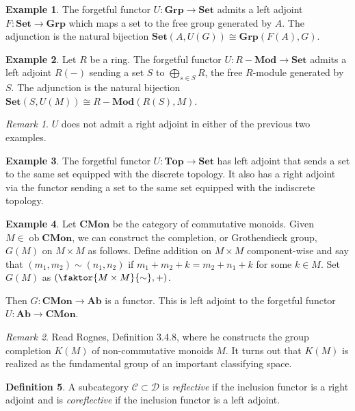\documentclass[10pt,letterpaper,cm]{nupset}
\theoremstyle{definition}
\newtheorem{definition}{Definition}
\newtheorem{exmp}[definition]{Example}
\theoremstyle{theorem}
\theoremstyle{remark}
\newtheorem{remark}{Remark}
\newcommand{\1}{\mathbf{1}}
\renewcommand{\c}{\mathscr{C}}
\renewcommand{\d}{\mathscr{D}}
\newcommand{\0}{\vec 0}
\DeclareMathOperator{\ob}{ob}
\begin{document}
\begin{exmp}
The forgetful functor $U: \mathbf{Grp} \to \mathbf{Set}$ admits a left adjoint $F: \mathbf{Set} \to \mathbf{Grp}$ which maps a set to the free group generated by $A$. The adjunction is the natural bijection $\mathbf{Set}(A, U(G)) \cong \mathbf{Grp}(F(A), G)$.
\end{exmp}

\begin{exmp}
Let $R$ be a ring. The forgetful functor $U: R-\mathbf{Mod}\to \mathbf{Set}$ admits a left adjoint $R(-)$ sending a set $S$ to $\bigoplus_{s\in S} R$, the free $R$-module generated by $S$. The adjunction is the natural bijection $\mathbf{Set}(S, U(M)) \cong R-\mathbf{Mod}(R(S), M)$.
\end{exmp}

\begin{remark}
$U$ does not admit a right adjoint in either of the previous two examples.
\end{remark}

\begin{exmp}
The forgetful functor $U: \mathbf{Top} \to \mathbf{Set}$ has left adjoint that sends a set to the same set equipped with the discrete topology.  It also has a right adjoint via the functor sending a set to the same set equipped with the indiscrete topology.
\end{exmp}

\begin{exmp}
Let $\mathbf{CMon}$ be the category of commutative monoids. Given $M\in \ob \mathbf{CMon}$, we can construct the completion, or Grothendieck group, $G(M)$ on $M\times M$ as follows. Define addition on $M \times M$ component-wise and say that $(m_1, m_2) \sim (n_1, n_2)$ if $m_1 + m_2 + k = m_2 +n_1 +k$ for some $k\in M$. Set $G(M)$ as $\left(\faktor{M\times M}{\sim}, +\right)$.

\medskip


Then $G: \mathbf{CMon} \to \mathbf{Ab}$ is a functor. This is left adjoint to the forgetful functor $U: \mathbf{Ab} \to \mathbf{CMon}$.
\end{exmp}

\begin{remark}
Read Rognes, Definition 3.4.8, where he constructs the group completion $K(M)$ of non-commutative monoids $M$. It turns out that $K(M)$ is realized as the fundamental group of an important classifying space. 
\end{remark}

\begin{definition}
A subcategory $\c \subset \d$ is \textit{reflective} if the inclusion functor is a right adjoint and is \textit{coreflective} if the inclusion functor is a left adjoint. 
\end{definition}
\end{document}
